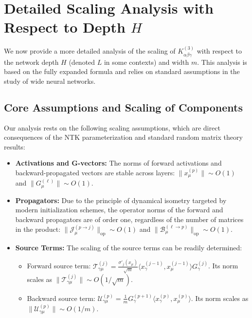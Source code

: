 \documentclass[11pt,a4paper]{article}
\begin{document}
\newpage

\section{Detailed Scaling Analysis with Respect to Depth $H$}

We now provide a more detailed analysis of the scaling of $K^{(3)}_{\alpha\beta\gamma}$ with respect to the network depth $H$ (denoted $L$ in some contexts) and width $m$. This analysis is based on the fully expanded formula and relies on standard assumptions in the study of wide neural networks.

\subsection{Core Assumptions and Scaling of Components}
Our analysis rests on the following scaling assumptions, which are direct consequences of the NTK parameterization and standard random matrix theory results:
\begin{itemize}
    \item \textbf{Activations and G-vectors:} The norms of forward activations and backward-propagated vectors are stable across layers: $\|x^{(p)}_\mu\| \sim O(1)$ and $\|G^{(\ell)}_\mu\| \sim O(1)$.
    \item \textbf{Propagators:} Due to the principle of dynamical isometry targeted by modern initialization schemes, the operator norms of the forward and backward propagators are of order one, regardless of the number of matrices in the product: $\|\mathcal{J}^{(p \to j)}_\mu\|_{\text{op}} \sim O(1)$ and $\|\mathcal{B}^{(\ell \to p)}_\mu\|_{\text{op}} \sim O(1)$.
    \item \textbf{Source Terms:} The scaling of the source terms can be readily determined:
    \begin{itemize}
        \item Forward source term: $\mathcal{T}^{(j)}_{\gamma\mu} = \frac{\sigma'_{j}(x_\mu)}{\sqrt{m}} \langle x^{(j-1)}_\gamma, x^{(j-1)}_\mu \rangle G^{(j)}_\gamma$. Its norm scales as $\|\mathcal{T}^{(j)}_{\gamma\mu}\| \sim O(1/\sqrt{m})$.
        \item Backward source term: $\mathcal{U}^{(p)}_{\gamma\mu} = \frac{1}{m} G^{(p+1)}_\gamma \langle x^{(p)}_\gamma, x^{(p)}_\mu \rangle$. Its norm scales as $\|\mathcal{U}^{(p)}_{\gamma\mu}\| \sim O(1/m)$.
    \end{itemize}
\end{itemize}
\end{document}
